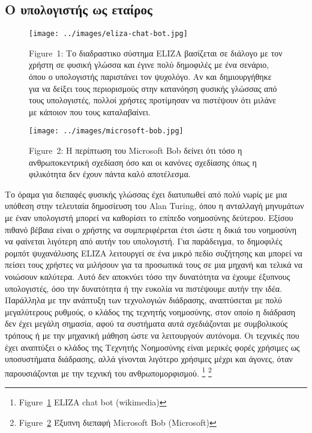 \documentclass[
]{article}
\begin{document}
\hypertarget{ux3bf-ux3c5ux3c0ux3bfux3bbux3bfux3b3ux3b9ux3c3ux3c4ux3aeux3c2-ux3c9ux3c2-ux3b5ux3c4ux3b1ux3afux3c1ux3bfux3c2}{%
\subsection{Ο υπολογιστής ως
εταίρος}\label{ux3bf-ux3c5ux3c0ux3bfux3bbux3bfux3b3ux3b9ux3c3ux3c4ux3aeux3c2-ux3c9ux3c2-ux3b5ux3c4ux3b1ux3afux3c1ux3bfux3c2}}

\leavevmode{}%
\begin{figure}
\hypertarget{fig:eliza-chat-bot}{%
\centering
\texttt{[image: ../images/eliza-chat-bot.jpg]}
\caption{Figure~1: Το διαδραστικο σύστημα ELIZA βασίζεται σε διάλογο με
τον χρήστη σε φυσική γλώσσα και έγινε πολύ δημοφιλές με ένα σενάριο,
όπου ο υπολογιστής παριστάνει τον ψυχολόγο. Αν και δημιουργήθηκε για να
δείξει τους περιορισμούς στην κατανόηση φυσικής γλώσσας από τους
υπολογιστές, πολλοί χρήστες προτίμησαν να πιστέψουν ότι μιλάνε με
κάποιον που τους καταλαβαίνει.}\label{fig:eliza-chat-bot}
}
\end{figure}

\leavevmode{}%
\begin{figure}
\hypertarget{fig:microsoft-bob}{%
\centering
\texttt{[image: ../images/microsoft-bob.jpg]}
\caption{Figure~2: Η περίπτωση του Microsoft Bob δείνει ότι τόσο η
ανθρωποκεντρική σχεδίαση όσο και οι κανόνες σχεδίασης όπως η φιλικότητα
δεν έχουν πάντα καλό αποτέλεσμα.}\label{fig:microsoft-bob}
}
\end{figure}

Το όραμα για διεπαφές φυσικής γλώσσας έχει διατυπωθεί από πολύ νωρίς με
μια υπόθεση στην τελευταία δημοσίευση του Alan Turing, όπου η ανταλλαγή
μηνυμάτων με έναν υπολογιστή μπορεί να καθορίσει το επίπεδο νοημοσύνης
δεύτερου. Εξίσου πιθανό βέβαια είναι ο χρήστης να συμπεριφέρεται έτσι
ώστε η δικιά του νοημοσύνη να φαίνεται λιγότερη από αυτήν του
υπολογιστή. Για παράδειγμα, το δημοφιλές ρομπότ ψυχανάλυσης ELIZA
λειτουργεί σε ένα μικρό πεδίο συζήτησης και μπορεί να πείσει τους
χρήστες να μιλήσουν για τα προσωπικά τους σε μια μηχανή και τελικά να
νοιώσουν καλύτερα. Αυτό δεν αποκνύει τόσο την δυνατότητα να έχουμε
έξυπνους υπολογιστές, όσο την δυνατότητα ή την ευκολία να πιστέψουμε
αυτήν την ιδέα. Παράλληλα με την ανάπτυξη των τεχνολογιών διάδρασης,
αναπτύσεται με πολύ μεγαλύτερους ρυθμούς, ο κλάδος της τεχνητής
νοημοσύνης, στον οποίο η διάδραση δεν έχει μεγάλη σημασία, αφού τα
συστήματα αυτά σχεδιάζονται με συμβολικούς τρόπους ή με την μηχανική
μάθηση ώστε να λειτουργούν αυτόνομα. Οι τεχνικές που έχει αναπτύξει ο
κλάδος της Τεχνητής Νοημοσύνης είναι μερικές φορές χρήσιμες ως
υποσυστήματα διάδρασης, αλλά γίνονται λιγότερο χρήσιμες μέχρι και
άγονες, όταν παρουσιάζονται με την τεχνική του ανθρωπομορφισμού.
\footnote{Figure~\protect\hyperlink{fig:eliza-chat-bot}{1} ELIZA chat
  bot (wikimedia)} \footnote{Figure~\protect\hyperlink{fig:microsoft-bob}{2}
  Έξυπνη διεπαφή Microsoft Bob (Microsoft)}
\end{document}
